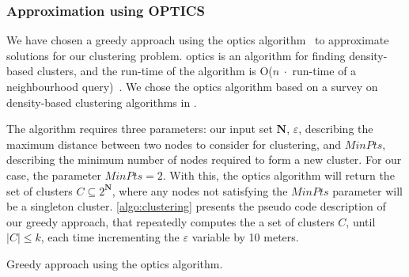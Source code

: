 


\subsubsection{Approximation using OPTICS}
We have chosen a greedy approach using the \gls{optics} algorithm~\cite{Ankerst:1999:OOP:304182.304187} to approximate solutions for our clustering problem. \gls{optics} is an algorithm for finding density-based clusters, and the run-time of the algorithm is O($n \ \cdot $ run-time of a neighbourhood query)~\cite[p.~53]{Ankerst:1999:OOP:304182.304187}. We chose the \gls{optics} algorithm based on a survey on density-based clustering algorithms in \cite{proceeding:clustering-Survey}.\smallbreak

The algorithm requires three parameters: our input set $\textbf{N}$, $\varepsilon$, describing the maximum distance between two nodes to consider for clustering, and $MinPts$, describing the minimum number of nodes required to form a new cluster. For our case, the parameter $MinPts = 2$. With this, the \gls{optics} algorithm will return the set of clusters $C \subseteq 2^{\textbf{N}}$, where any nodes not satisfying the $MinPts$ parameter will be a singleton cluster. \autoref{algo:clustering} presents the pseudo code description of our greedy approach, that repeatedly computes the a set of clusters $C$, until $|C| \leq k$, each time incrementing the $\varepsilon$ variable by 10 meters.

\begin{algorithm}[H]
    \DontPrintSemicolon

    \caption{Greedy approach using the \gls{optics} algorithm.}
    \label{algo:clustering}
\end{algorithm}

